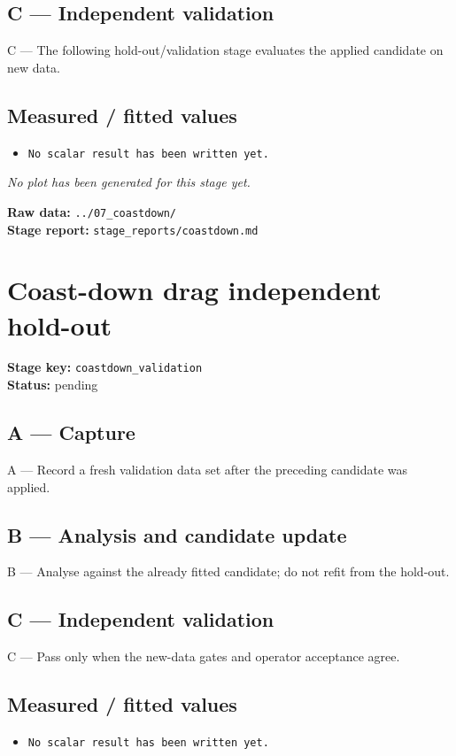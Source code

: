 \documentclass[11pt,a4paper]{article}
\begin{document}
\subsection*{C --- Independent validation}
C — The following hold-out/validation stage evaluates the applied candidate on new data.

\subsection*{Measured / fitted values}
\begin{itemize}\setlength\itemsep{0pt}
\item \texttt{No scalar result has been written yet.}
\end{itemize}

\textit{No plot has been generated for this stage yet.}

\vfill
\textbf{Raw data:} \texttt{../07\_coastdown/}\\
\textbf{Stage report:} \texttt{stage\_reports/coastdown.md}
\clearpage
\small
\section*{Coast-down drag independent hold-out}
\textbf{Stage key:} \texttt{coastdown\_validation}\\
\textbf{Status:} pending\\

\subsection*{A --- Capture}
A — Record a fresh validation data set after the preceding candidate was applied.

\subsection*{B --- Analysis and candidate update}
B — Analyse against the already fitted candidate; do not refit from the hold-out.

\subsection*{C --- Independent validation}
C — Pass only when the new-data gates and operator acceptance agree.

\subsection*{Measured / fitted values}
\begin{itemize}\setlength\itemsep{0pt}
\item \texttt{No scalar result has been written yet.}
\end{itemize}
\end{document}
